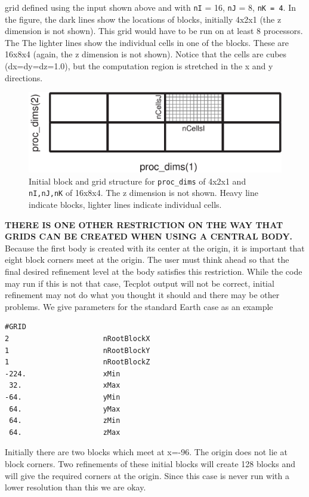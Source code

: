 grid defined using the input shown above and 
with {\tt nI} = 16, {\tt nJ} = 8, {\tt  nK = 4}.
In the figure, the dark lines show the locations of blocks, initially
4x2x1 (the z dimension is not shown).  This grid would have to be 
run on at least 8 processors.  The
The lighter lines show the individual cells in one of the blocks.  These are 16x8x4 
(again, the z dimension is not shown).  Notice that the cells are cubes (dx=dy=dz=1.0),
but the computation region is stretched in the x and y directions.
\begin{figure}
\begin{center}
\includegraphics*[width=6.0in]{proc_dims.pdf}
\end{center}
\caption{Initial block and grid structure for {\tt proc\_dims} of 4x2x1
and {\tt nI,nJ,nK} of 16x8x4.  The z dimension is not shown.  Heavy line indicate
blocks, lighter lines indicate individual cells.
\label{fig:stretched_initial_grid}
}
\end{figure}

{\bf THERE IS ONE OTHER RESTRICTION ON THE WAY THAT GRIDS CAN BE CREATED
WHEN USING A CENTRAL BODY.}
Because the first body is created with its center at the origin, it is
important that eight block corners meet at the origin.  The user must 
think ahead so that the final desired refinement level at the body
satisfies this restriction.  While
the code may run if this is not that case, Tecplot output will not be
correct, initial refinement may not do what you thought it should and
there may be other problems.  
We give parameters for the standard Earth case as an example
\begin{verbatim}
#GRID        
2                      nRootBlockX
1                      nRootBlockY
1                      nRootBlockZ
-224.                  xMin
 32.                   xMax
-64.                   yMin
 64.                   yMax 
 64.                   zMin
 64.                   zMax
\end{verbatim}
Initially there are two blocks which meet at x=-96. 
The origin does not lie at block corners.
Two refinements of these initial blocks will create 128 blocks and
will give the required corners at the origin.  Since this case is
never run with a lower resolution than this we are okay.


